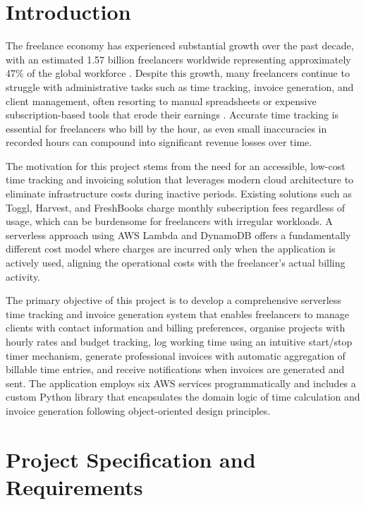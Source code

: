 \documentclass[conference]{IEEEtran}
\begin{document}
\section{Introduction}

The freelance economy has experienced substantial growth over the past decade, with an estimated 1.57 billion freelancers worldwide representing approximately 47\% of the global workforce \cite{freelancestats}. Despite this growth, many freelancers continue to struggle with administrative tasks such as time tracking, invoice generation, and client management, often resorting to manual spreadsheets or expensive subscription-based tools that erode their earnings \cite{cloudpatterns}. Accurate time tracking is essential for freelancers who bill by the hour, as even small inaccuracies in recorded hours can compound into significant revenue losses over time.

The motivation for this project stems from the need for an accessible, low-cost time tracking and invoicing solution that leverages modern cloud architecture to eliminate infrastructure costs during inactive periods. Existing solutions such as Toggl, Harvest, and FreshBooks charge monthly subscription fees regardless of usage, which can be burdensome for freelancers with irregular workloads. A serverless approach using AWS Lambda and DynamoDB offers a fundamentally different cost model where charges are incurred only when the application is actively used, aligning the operational costs with the freelancer's actual billing activity.

The primary objective of this project is to develop a comprehensive serverless time tracking and invoice generation system that enables freelancers to manage clients with contact information and billing preferences, organise projects with hourly rates and budget tracking, log working time using an intuitive start/stop timer mechanism, generate professional invoices with automatic aggregation of billable time entries, and receive notifications when invoices are generated and sent. The application employs six AWS services programmatically and includes a custom Python library that encapsulates the domain logic of time calculation and invoice generation following object-oriented design principles.

\section{Project Specification and Requirements}
\end{document}
